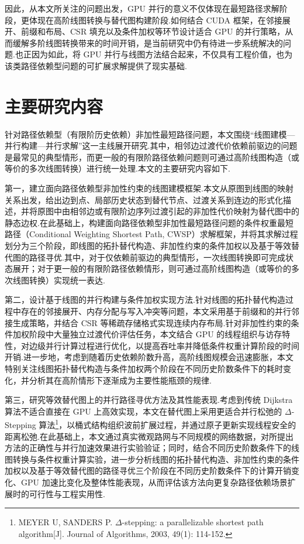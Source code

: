 因此，从本文所关注的问题出发，GPU 并行的意义不仅体现在最短路径求解阶段，更体现在高阶线图转换与替代图构建阶段.如何结合 CUDA 框架，在邻接展开、前缀和布局、CSR 填充以及条件加权等环节设计适合 GPU 的并行策略，从而缓解多阶线图转换带来的时间开销，是当前研究中仍有待进一步系统解决的问题.也正因为如此，将 GPU 并行与线图方法结合起来，不仅具有工程价值，也为该类路径依赖型问题的可扩展求解提供了现实基础.

\section{主要研究内容}

针对路径依赖型（有限阶历史依赖）非加性最短路径问题，本文围绕“线图建模—并行构建—并行求解”这一主线展开研究.其中，相邻边过渡代价依赖前驱边的问题是最常见的典型情形，而更一般的有限阶路径依赖问题则可通过高阶线图构造（或等价的多次线图转换）进行统一处理.本文的主要研究内容如下.

第一，建立面向路径依赖型非加性约束的线图建模框架.本文从原图到线图的映射关系出发，给出边到点、局部历史状态到替代节点、过渡关系到连边的形式化描述，并将原图中由相邻边或有限阶边序列过渡引起的非加性代价映射为替代图中的静态边权.在此基础上，构建面向路径依赖型非加性最短路径问题的条件权重最短路径（Conditional Weighting Shortest Path, CWSP）求解框架，并将其求解过程划分为三个阶段，即线图的拓扑替代构造、非加性约束的条件加权以及基于等效替代图的路径寻优.其中，对于仅依赖前驱边的典型情形，一次线图转换即可完成状态展开；对于更一般的有限阶路径依赖情形，则可通过高阶线图构造（或等价的多次线图转换）实现统一表达.

第二，设计基于线图的并行构建与条件加权实现方法.针对线图的拓扑替代构造过程中存在的邻接展开、内存分配与写入冲突等问题，本文采用基于前缀和的并行邻接生成策略，并结合 CSR 等稀疏存储格式实现连续内存布局.针对非加性约束的条件加权阶段中大量独立过渡代价评估任务，本文结合 GPU 的线程组织与访存特性，对边级并行计算过程进行优化，以提高吞吐率并降低条件权重计算阶段的时间开销.进一步地，考虑到随着历史依赖阶数升高，高阶线图规模会迅速膨胀，本文特别关注线图拓扑替代构造与条件加权两个阶段在不同历史阶数条件下的耗时变化，并分析其在高阶情形下逐渐成为主要性能瓶颈的规律.

第三，研究等效替代图上的并行路径寻优方法及其性能表现.考虑到传统 Dijkstra 算法不适合直接在 GPU 上高效实现，本文在替代图上采用更适合并行松弛的 $\Delta$-Stepping 算法\footnote{MEYER U, SANDERS P. $\Delta$-stepping: a parallelizable shortest path algorithm[J]. Journal of Algorithms, 2003, 49(1): 114-152.}，以桶式结构组织波前扩展过程，并通过原子更新实现线程安全的距离松弛.在此基础上，本文通过真实微观路网与不同规模的网络数据，对所提出方法的正确性与并行加速效果进行实验验证；同时，结合不同历史阶数条件下的线图转换与条件权重计算实验，进一步分析线图的拓扑替代构造、非加性约束的条件加权以及基于等效替代图的路径寻优三个阶段在不同历史阶数条件下的计算开销变化、GPU 加速比变化及整体性能表现，从而评估该方法向更复杂路径依赖场景扩展时的可行性与工程实用性.


